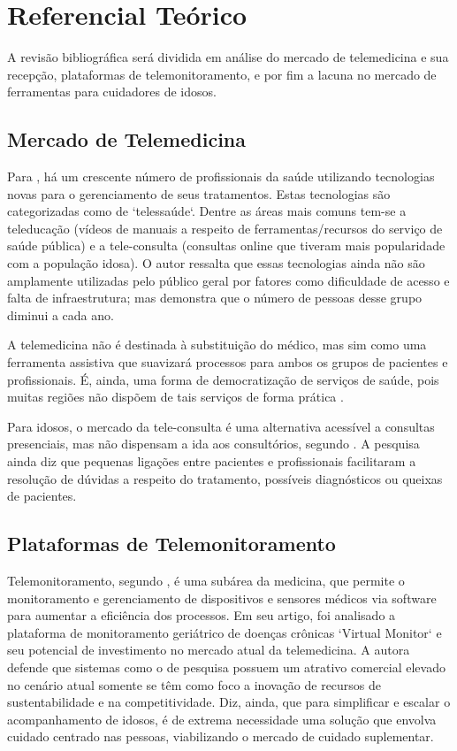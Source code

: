 \documentclass[
	article,			%
	12pt,				%
	oneside,			%
	a4paper,			%
    BIBLATEX,           %
	english,			%
	brazil,				%
	sumario=tradicional
	]{abntex2}
\begin{document}
\section{Referencial Teórico}

A revisão bibliográfica será dividida em análise do mercado de telemedicina e sua recepção, plataformas de telemonitoramento, e por fim a lacuna no mercado de ferramentas para cuidadores de idosos.

\subsection{Mercado de Telemedicina}

Para , há um crescente número de profissionais da saúde utilizando tecnologias novas para o gerenciamento de seus tratamentos. Estas tecnologias são categorizadas como de `telessaúde`. Dentre as áreas mais comuns tem-se a teleducação (vídeos de manuais a respeito de ferramentas/recursos do serviço de saúde pública) e a tele-consulta (consultas online que tiveram mais popularidade com a população idosa). O autor ressalta que essas tecnologias ainda não são amplamente utilizadas pelo público geral por fatores como dificuldade de acesso e falta de infraestrutura; mas demonstra que o número de pessoas desse grupo diminui a cada ano.

A telemedicina não é destinada à substituição do médico, mas sim como uma ferramenta assistiva que suavizará processos para ambos os grupos de pacientes e profissionais. É, ainda, 
uma forma de democratização de serviços de saúde, pois muitas regiões não dispõem de tais serviços de forma prática \cite{Schaefer2023telemedicina}.

Para idosos, o mercado da tele-consulta é uma alternativa acessível a consultas presenciais, mas não dispensam a ida aos consultórios, segundo \cite{quirino2023percepcao}. A pesquisa ainda diz que pequenas ligações entre pacientes e profissionais facilitaram a resolução de dúvidas a respeito do tratamento, possíveis diagnósticos ou queixas de pacientes.

\subsection{Plataformas de Telemonitoramento}

Telemonitoramento, segundo , é uma subárea da medicina, que permite o monitoramento e gerenciamento de dispositivos e sensores médicos via software para aumentar a eficiência dos processos. Em seu artigo, foi analisado a plataforma de monitoramento geriátrico de doenças crônicas `Virtual Monitor` e seu potencial de investimento no mercado atual da telemedicina. A autora defende que sistemas como o de pesquisa possuem um atrativo comercial elevado no cenário atual somente se têm como foco a inovação de recursos de sustentabilidade e na competitividade. Diz, ainda, que para simplificar e escalar o acompanhamento de idosos, é de extrema necessidade uma solução que envolva cuidado centrado nas pessoas, viabilizando o mercado de cuidado suplementar.
\end{document}

